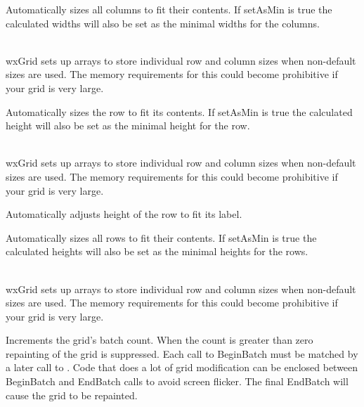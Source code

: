 Automatically sizes all columns to fit their contents. If setAsMin is true the calculated widths will
also be set as the minimal widths for the columns.

\\
wxGrid sets up arrays to store individual row and column sizes when non-default sizes are used.
The memory requirements for this could become prohibitive if your grid is very large.



\label{wxgridautosizerow}


Automatically sizes the row to fit its contents. If setAsMin is true the calculated height will
also be set as the minimal height for the row.

\\
wxGrid sets up arrays to store individual row and column sizes when non-default sizes are used.
The memory requirements for this could become prohibitive if your grid is very large.



\label{wxgridautosizerowlabelsize}


Automatically adjusts height of the row to fit its label.



\label{wxgridautosizerows}


Automatically sizes all rows to fit their contents. If setAsMin is true the calculated heights will
also be set as the minimal heights for the rows.

\\
wxGrid sets up arrays to store individual row and column sizes when non-default sizes are used.
The memory requirements for this could become prohibitive if your grid is very large.



\label{wxgridbeginbatch}


Increments the grid's batch count. When the count is greater than zero repainting of
the grid is suppressed. Each call to BeginBatch must be matched by a later call to
. Code that does a lot of grid
modification can be enclosed between BeginBatch and EndBatch calls to avoid
screen flicker. The final EndBatch will cause the grid to be repainted.

